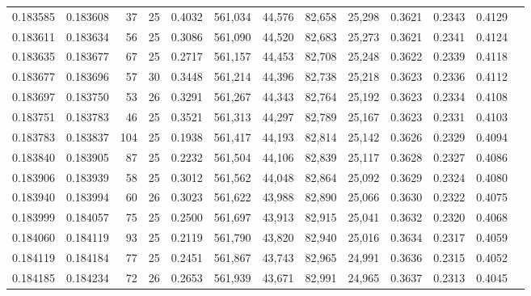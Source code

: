 \begin{tabular}{rrrrrrrrrrrrr}
0.183585 & 0.183608 &  37 &  25 &                                     0.4032 & 561,034 &  44,576 &  82,658 &  25,298 & 0.3621 & 0.2343 & 0.4129 \\
0.183611 & 0.183634 &  56 &  25 &                                     0.3086 & 561,090 &  44,520 &  82,683 &  25,273 & 0.3621 & 0.2341 & 0.4124 \\
0.183635 & 0.183677 &  67 &  25 &                                     0.2717 & 561,157 &  44,453 &  82,708 &  25,248 & 0.3622 & 0.2339 & 0.4118 \\
0.183677 & 0.183696 &  57 &  30 &                                     0.3448 & 561,214 &  44,396 &  82,738 &  25,218 & 0.3623 & 0.2336 & 0.4112 \\
0.183697 & 0.183750 &  53 &  26 &                                     0.3291 & 561,267 &  44,343 &  82,764 &  25,192 & 0.3623 & 0.2334 & 0.4108 \\
0.183751 & 0.183783 &  46 &  25 &                                     0.3521 & 561,313 &  44,297 &  82,789 &  25,167 & 0.3623 & 0.2331 & 0.4103 \\
0.183783 & 0.183837 & 104 &  25 &                                     0.1938 & 561,417 &  44,193 &  82,814 &  25,142 & 0.3626 & 0.2329 & 0.4094 \\
0.183840 & 0.183905 &  87 &  25 &                                     0.2232 & 561,504 &  44,106 &  82,839 &  25,117 & 0.3628 & 0.2327 & 0.4086 \\
0.183906 & 0.183939 &  58 &  25 &                                     0.3012 & 561,562 &  44,048 &  82,864 &  25,092 & 0.3629 & 0.2324 & 0.4080 \\
0.183940 & 0.183994 &  60 &  26 &                                     0.3023 & 561,622 &  43,988 &  82,890 &  25,066 & 0.3630 & 0.2322 & 0.4075 \\
0.183999 & 0.184057 &  75 &  25 &                                     0.2500 & 561,697 &  43,913 &  82,915 &  25,041 & 0.3632 & 0.2320 & 0.4068 \\
0.184060 & 0.184119 &  93 &  25 &                                     0.2119 & 561,790 &  43,820 &  82,940 &  25,016 & 0.3634 & 0.2317 & 0.4059 \\
0.184119 & 0.184184 &  77 &  25 &                                     0.2451 & 561,867 &  43,743 &  82,965 &  24,991 & 0.3636 & 0.2315 & 0.4052 \\
0.184185 & 0.184234 &  72 &  26 &                                     0.2653 & 561,939 &  43,671 &  82,991 &  24,965 & 0.3637 & 0.2313 & 0.4045 \\

\end{tabular}
